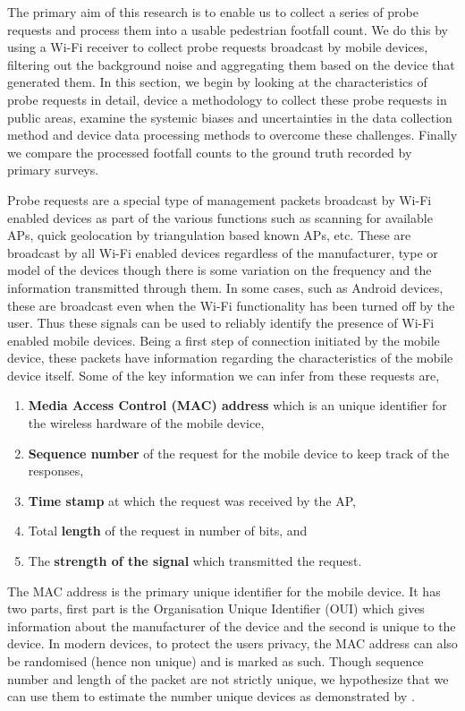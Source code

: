 The primary aim of this research is to enable us to collect a series of probe
requests and process them into a usable pedestrian footfall count. We do this by
using a Wi-Fi receiver to collect probe requests broadcast by mobile devices,
filtering out the background noise and aggregating them based on the device that
generated them. In this section, we begin by looking at the characteristics of
probe requests in detail, device a methodology to collect these probe requests
in public areas, examine the systemic biases and uncertainties in the data
collection method and device data processing methods to overcome these
challenges. Finally we compare the processed footfall counts to the ground truth
recorded by primary surveys.

Probe requests are a special type of management packets broadcast by Wi-Fi
enabled devices as part of the various functions such as scanning for available
APs, quick geolocation by triangulation based known APs, etc. These are
broadcast by all Wi-Fi enabled devices regardless of the manufacturer, type or
model of the devices though there is some variation on the frequency and the
information transmitted through them. In some cases, such as Android devices,
these are broadcast even when the Wi-Fi functionality has been turned off by the
user. Thus these signals can be used to reliably identify the presence of Wi-Fi
enabled mobile devices. Being a first step of connection initiated by the mobile
device, these packets have information regarding the characteristics of the
mobile device itself. Some of the key information we can infer from these
requests are,

\begin{enumerate} 
\item \textbf{Media Access Control (MAC) address} which is an unique identifier
	for the wireless hardware of the mobile device, 
\item \textbf{Sequence number} of the request for the mobile device to keep
	track of the responses, 
\item \textbf{Time stamp} at which the request was received by the AP, 
\item Total \textbf{length} of the request in number of bits, and 
\item The \textbf{strength of the signal} which transmitted the request.
\end{enumerate}

The MAC address is the primary unique identifier for the mobile device. It has
two parts, first part is the Organisation Unique Identifier (OUI) which gives
information about the manufacturer of the device and the second is unique to the
device. In modern devices, to protect the users privacy, the MAC address can
also be randomised (hence non unique) and is marked as such. Though sequence
number and length of the packet are not strictly unique, we hypothesize that we
can use them to estimate the number unique devices as demonstrated by
\citep{vanhoef2016}.

